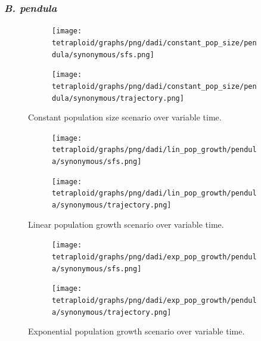 \documentclass[hidelinks,11pt]{article}
\newcommand{\pendula}{\textit{B. pendula}}
\begin{document}
    \subsubsection{\pendula{}}

    \begin{figure}[H]
        \centering
        \begin{subfigure}[b]{0.465\textwidth}
            \texttt{[image: tetraploid/graphs/png/dadi/constant\_pop\_size/pendula/synonymous/sfs.png]}
        \end{subfigure}
        \hfill
        \begin{subfigure}[b]{0.525\textwidth}
            \texttt{[image: tetraploid/graphs/png/dadi/constant\_pop\_size/pendula/synonymous/trajectory.png]}
        \end{subfigure}
        \caption{Constant population size scenario over variable time.}
        \label{fig:constant_pop_size_pendula}
    \end{figure}

    \begin{figure}[H]
        \centering
        \begin{subfigure}[b]{0.465\textwidth}
            \texttt{[image: tetraploid/graphs/png/dadi/lin\_pop\_growth/pendula/synonymous/sfs.png]}
        \end{subfigure}
        \hfill
        \begin{subfigure}[b]{0.525\textwidth}
            \texttt{[image: tetraploid/graphs/png/dadi/lin\_pop\_growth/pendula/synonymous/trajectory.png]}
        \end{subfigure}
        \caption{Linear population growth scenario over variable time.}
        \label{fig:lin_pop_growth_pendula}
    \end{figure}

    \begin{figure}[H]
        \centering
        \begin{subfigure}[b]{0.465\textwidth}
            \texttt{[image: tetraploid/graphs/png/dadi/exp\_pop\_growth/pendula/synonymous/sfs.png]}
        \end{subfigure}
        \hfill
        \begin{subfigure}[b]{0.525\textwidth}
            \texttt{[image: tetraploid/graphs/png/dadi/exp\_pop\_growth/pendula/synonymous/trajectory.png]}
        \end{subfigure}
        \caption{Exponential population growth scenario over variable time.}
        \label{fig:exp_pop_growth_pendula}
    \end{figure}
\end{document}
